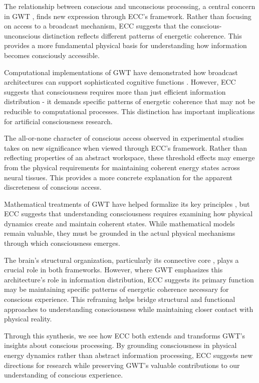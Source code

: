 The relationship between conscious and unconscious processing, a central concern in GWT \cite{Dehaene2011}, finds new expression through ECC's framework. Rather than focusing on access to a broadcast mechanism, ECC suggests that the conscious-unconscious distinction reflects different patterns of energetic coherence. This provides a more fundamental physical basis for understanding how information becomes consciously accessible.

Computational implementations of GWT have demonstrated how broadcast architectures can support sophisticated cognitive functions \cite{Franklin1999}. However, ECC suggests that consciousness requires more than just efficient information distribution - it demands specific patterns of energetic coherence that may not be reducible to computational processes. This distinction has important implications for artificial consciousness research.

The all-or-none character of conscious access observed in experimental studies \cite{Sergent2004} takes on new significance when viewed through ECC's framework. Rather than reflecting properties of an abstract workspace, these threshold effects may emerge from the physical requirements for maintaining coherent energy states across neural tissues. This provides a more concrete explanation for the apparent discreteness of conscious access.

Mathematical treatments of GWT have helped formalize its key principles \cite{Wallace2005}, but ECC suggests that understanding consciousness requires examining how physical dynamics create and maintain coherent states. While mathematical models remain valuable, they must be grounded in the actual physical mechanisms through which consciousness emerges.

The brain's structural organization, particularly its connective core \cite{Shanahan2012}, plays a crucial role in both frameworks. However, where GWT emphasizes this architecture's role in information distribution, ECC suggests its primary function may be maintaining specific patterns of energetic coherence necessary for conscious experience. This reframing helps bridge structural and functional approaches to understanding consciousness while maintaining closer contact with physical reality.

Through this synthesis, we see how ECC both extends and transforms GWT's insights about conscious processing. By grounding consciousness in physical energy dynamics rather than abstract information processing, ECC suggests new directions for research while preserving GWT's valuable contributions to our understanding of conscious experience.